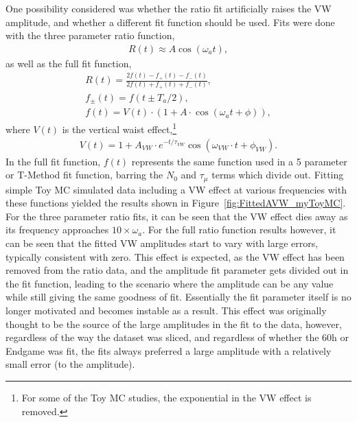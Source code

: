\documentclass[12pt,letterpaper]{article}
\newcommand{\figref}[1]{Figure~\ref{#1}}
\begin{document}
One possibility considered was whether the ratio fit artificially raises the VW amplitude, and whether a different fit function should be used. Fits were done with the three parameter ratio function,
    \begin{align} \label{eq:threeparamratio}
        R(t) \approx A \cos(\omega_{a}t),
    \end{align}
as well as the full fit function,
    \begin{gather}
        R(t) = \frac{2f(t) - f_{+}(t) - f_{-}(t)}{2f(t) + f_{+}(t) + f_{-}(t)}, \\
        f_{\pm}(t) = f(t \pm T_{a}/2), \\
        f(t) = V(t) \cdot (1 + A \cdot \cos(\omega_{a}t + \phi)),
    \label{eq:fullratiofunction}
    \end{gather}
where $V(t)$ is the vertical waist effect,\footnote{For some of the Toy MC studies, the exponential in the VW effect is removed.}
    \begin{align} \label{eq:threeparamratio}
        V(t) = 1 + A_{VW} \cdot e^{-t/\tau_{VW}} \cos{(\omega_{VW} \cdot t + \phi_{VW})}.
    \end{align}
In the full fit function, $f(t)$ represents the same function used in a 5 parameter or T-Method fit function, barring the $N_{0}$ and $\tau_{\mu}$ terms which divide out. Fitting simple Toy MC simulated data including a VW effect at various frequencies with these functions yielded the results shown in \figref{fig:FittedAVW_myToyMC}. For the three parameter ratio fits, it can be seen that the VW effect dies away as its frequency approaches $10 \times \omega_{a}$. For the full ratio function results however, it can be seen that the fitted VW amplitudes start to vary with large errors, typically consistent with zero. This effect is expected, as the VW effect has been removed from the ratio data, and the amplitude fit parameter gets divided out in the fit function, leading to the scenario where the amplitude can be any value while still giving the same goodness of fit. Essentially the fit parameter itself is no longer motivated and becomes instable as a result. This effect was originally thought to be the source of the large amplitudes in the fit to the data, however, regardless of the way the dataset was sliced, and regardless of whether the 60h or Endgame was fit, the fits always preferred a large amplitude with a relatively small error (to the amplitude).
\end{document}
